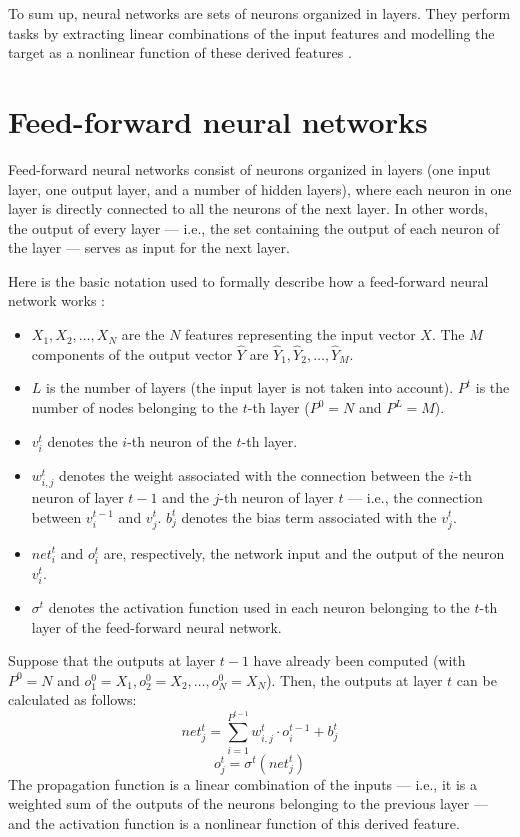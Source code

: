         
    
        To sum up, neural networks are sets of neurons organized in layers. They perform tasks by extracting linear combinations of the input features and modelling the target as a nonlinear function of these derived features \cite[389]{Hastie}.
    \section{Feed-forward neural networks}
        Feed-forward neural networks consist of neurons organized in layers (one input layer, one output layer, and a number of hidden layers), where each neuron in one layer is directly connected to all the neurons of the next layer. In other words, the output of every layer --- i.e., the set containing the output of each neuron of the layer --- serves as input for the next layer.
        
        Here is the basic notation used to formally describe how a feed-forward neural network works \cite[269--270]{Shalev-Shwartz}:
        \begin{itemize}
            \item \(X_1,X_2,\dots,X_N\) are the \(N\) features representing the input vector \(X\). The \(M\) components of the output vector \(\hat{Y}\) are \(\hat{Y}_1,\hat{Y}_2,\dots,\hat{Y}_M\).
            \item \(L\) is the number of layers (the input layer is not taken into account). \(P^t\) is the number of nodes belonging to the \(t\)-th layer (\(P^0=N\) and \(P^L=M\)).
            \item \(v_{i}^{t}\) denotes the \(i\)-th neuron of the \(t\)-th layer.
            \item \(w_{i,j}^{t}\) denotes the weight associated with the connection between the \(i\)-th neuron of layer \(t-1\) and the \(j\)-th neuron of layer \(t\) --- i.e., the connection between \(v_{i}^{t-1}\) and \(v_{j}^{t}\). \(b_{j}^{t}\) denotes the bias term associated with the \(v_{j}^{t}\).
            \item \(net_{i}^{t}\) and \(o_{i}^{t}\) are, respectively, the network input and the output of the neuron \(v_{i}^{t}\).
            \item \(\sigma^{t}\) denotes the activation function used in each neuron belonging to the \(t\)-th layer of the feed-forward neural network.
        \end{itemize}
        
        Suppose that the outputs at layer \(t-1\) have already been computed (with \(P^{0} = N\) and \(o_{1}^{0}=X_1, o_{2}^{0}=X_2,\dots, o_{N}^{0}=X_N\)). Then, the outputs at layer \(t\) can be calculated as follows:
        \[net_{j}^{t} = \sum_{i=1}^{P^{t-1}}w_{i,j}^{t} \cdot o_{i}^{t-1} + b_{j}^{t}\]
        \[o_{j}^{t} = \sigma^{t}\left(net_{j}^{t}\right)\]
        The propagation function is a linear combination of the inputs --- i.e., it is a weighted sum of the outputs of the neurons belonging to the previous layer --- and the activation function is a nonlinear function of this derived feature.
        
